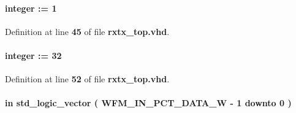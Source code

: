 \paragraph[{W\+F\+M\+\_\+\+C\+N\+T\+R\+L\+\_\+\+R\+A\+TE}]{ {\bfseries \textcolor{vhdlchar}{ }} {\bfseries \textcolor{comment}{integer}\textcolor{vhdlchar}{ }\textcolor{vhdlchar}{ }\textcolor{vhdlchar}{\+:}\textcolor{vhdlchar}{=}\textcolor{vhdlchar}{ }\textcolor{vhdlchar}{ } \textcolor{vhdldigit}{1} \textcolor{vhdlchar}{ }} \hspace{0.3cm}{\ttfamily [Generic]}}\label{classrxtx__top_a024f313e6e5bd343b2b7df75862e3d5d}


Definition at line {\bf 45} of file {\bf rxtx\+\_\+top.\+vhd}.

\paragraph[{W\+F\+M\+\_\+\+D\+A\+T\+A\+\_\+\+W\+I\+D\+TH}]{ {\bfseries \textcolor{vhdlchar}{ }} {\bfseries \textcolor{comment}{integer}\textcolor{vhdlchar}{ }\textcolor{vhdlchar}{ }\textcolor{vhdlchar}{\+:}\textcolor{vhdlchar}{=}\textcolor{vhdlchar}{ }\textcolor{vhdlchar}{ } \textcolor{vhdldigit}{32} \textcolor{vhdlchar}{ }} \hspace{0.3cm}{\ttfamily [Generic]}}\label{classrxtx__top_aad064533fc3ebefc83fb4bb4321c904a}


Definition at line {\bf 52} of file {\bf rxtx\+\_\+top.\+vhd}.

\paragraph[{wfm\+\_\+in\+\_\+pct\+\_\+data}]{ {\bfseries \textcolor{keywordflow}{in}\textcolor{vhdlchar}{ }} {\bfseries \textcolor{comment}{std\+\_\+logic\+\_\+vector}\textcolor{vhdlchar}{ }\textcolor{vhdlchar}{(}\textcolor{vhdlchar}{ }\textcolor{vhdlchar}{ }\textcolor{vhdlchar}{ }\textcolor{vhdlchar}{ }{\bfseries {\bf W\+F\+M\+\_\+\+I\+N\+\_\+\+P\+C\+T\+\_\+\+D\+A\+T\+A\+\_\+W}} \textcolor{vhdlchar}{-\/}\textcolor{vhdlchar}{ } \textcolor{vhdldigit}{1} \textcolor{vhdlchar}{ }\textcolor{keywordflow}{downto}\textcolor{vhdlchar}{ }\textcolor{vhdlchar}{ } \textcolor{vhdldigit}{0} \textcolor{vhdlchar}{ }\textcolor{vhdlchar}{)}\textcolor{vhdlchar}{ }} \hspace{0.3cm}{\ttfamily [Port]}}\label{classrxtx__top_a764ad11a1ff6b12dfdf0f7fe122a2954}


